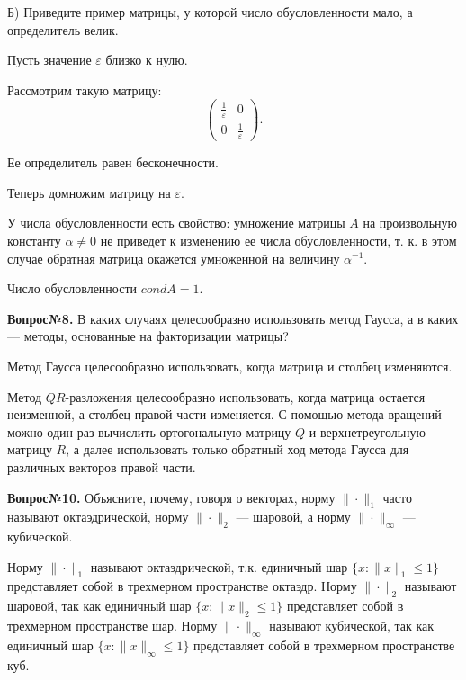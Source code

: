 \documentclass{article}
\begin{document}
 Б) Приведите пример матрицы, у которой число обусловленности мало, а определитель велик.
 
 Пусть значение $\varepsilon$ близко к нулю.
 
 Рассмотрим такую матрицу:
 \[
 \begin{pmatrix}
 	\frac{1}{\varepsilon} & 0\\
 	0 & \frac{1}{\varepsilon}
 \end{pmatrix}.
 \]
 
 Ее определитель равен бесконечности.
 
 Теперь домножим матрицу на $\varepsilon$.
 
У числа обусловленности есть свойство: умножение матрицы $A$ на произвольную
константу $\alpha \ne 0$ не приведет к изменению ее числа обусловленности, т. к. в этом случае обратная матрица окажется умноженной
на величину $\alpha^{-1}$.

Число обусловленности $cond A = 1$.

\textbf{Вопрос№8.} В каких случаях целесообразно использовать метод Гаусса, а в каких — методы, основанные на факторизации матрицы?

Метод Гаусса целесообразно использовать, когда матрица и столбец изменяются. 

Метод $QR$-разложения целесообразно использовать, когда матрица остается неизменной, а столбец правой части изменяется. С помощью метода вращений можно один раз вычислить ортогональную матрицу $Q$ и верхнетреугольную матрицу $R$, а далее использовать только обратный ход метода Гаусса для различных векторов правой части.

 \textbf{Вопрос№10.} Объясните, почему, говоря о векторах, норму $\|\cdot\|_1$ часто называют октаэдрической, норму $\|\cdot\|_2$ — шаровой, а норму $\|\cdot\|_{\infty}$ — кубической. 

Норму $\|\cdot\|_1$ называют октаэдрической, т.к. единичный шар ${\{ x: \|x\|_1 \leq 1\}}$ представляет собой в трехмерном пространстве октаэдр. Норму $\|\cdot\|_2$ называют шаровой, так как единичный шар $\{ x: \|x\|_2 \leq 1\}$ представляет собой в трехмерном пространстве шар. Норму $\|\cdot\|_{\infty}$ называют кубической, так как единичный шар $\{ x: \|x\|_{\infty} \leq 1\}$ представляет собой в трехмерном пространстве куб.
\end{document}
